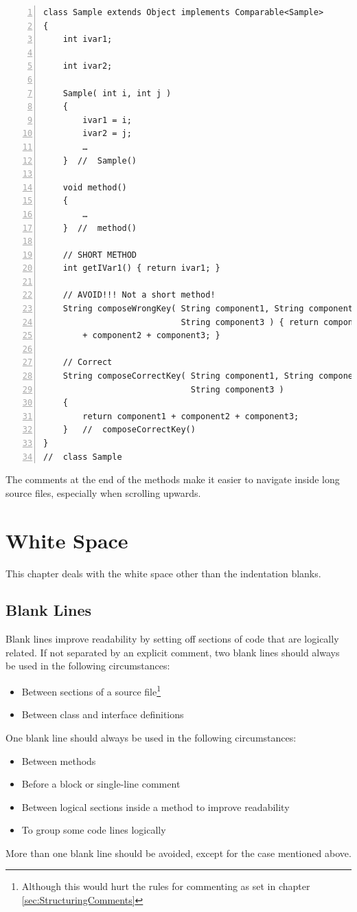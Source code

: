 \documentclass[12pt,a4paper,titlepage, parskip=half, headsepline, footsepline, cleardoubleplain]{scrbook}
\begin{document}
\begin{lstlisting}[numbers=left]
class Sample extends Object implements Comparable<Sample>
{
    int ivar1;
    
    int ivar2;
    
    Sample( int i, int j ) 
    {
        ivar1 = i;
        ivar2 = j;
        …
    }  //  Sample()
    
    void method()
    {
        …
    }  //  method()
    
    // SHORT METHOD
    int getIVar1() { return ivar1; }
    
    // AVOID!!! Not a short method!
    String composeWrongKey( String component1, String component2,
                            String component3 ) { return component1
        + component2 + component3; }
        
    // Correct
    String composeCorrectKey( String component1, String component2,
                              String component3 )
    {
        return component1 + component2 + component3;
    }   //  composeCorrectKey()
}
//  class Sample
\end{lstlisting}

The comments at the end of the methods make it easier to navigate inside long source files, especially when scrolling upwards.

\section{White Space}
This chapter deals with the white space other than the indentation blanks.

\subsection{Blank Lines}\label{sec:BlankLines}
Blank lines improve readability by setting off sections of code that are logically related.
If not separated by an explicit comment, two blank lines should always be used in the following circumstances:
\begin{itemize}
\item{Between sections of a source file\footnote{Although this would hurt the rules for commenting as set in chapter \ref{sec:StructuringComments}}}
\item{Between class and interface definitions}
\end{itemize}

One blank line should always be used in the following circumstances:
\begin{itemize}
\item{Between methods}
\item{Before a block or single-line comment}
\item{Between logical sections inside a method to improve readability}
\item{To group some code lines logically}
\end{itemize}
More than one blank line should be avoided, except for the case mentioned above.
\end{document}
